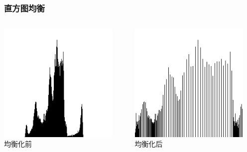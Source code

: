 \documentclass[12pt,hyperref={CJKbookmarks=true}]{beamer}
\begin{document}
\begin{frame}
  \frametitle{直方图均衡}
  \begin{columns}[onlytextwidth]
    \begin{column}{0.5\textwidth}
      \centering
      \includegraphics[width=0.9\textwidth]{histsrc.png}\\
      \footnotesize 均衡化前
    \end{column}
    \begin{column}{0.5\textwidth}
      \centering
      \includegraphics[width=0.9\textwidth]{histequal.png}\\
      \footnotesize 均衡化后
    \end{column}
  \end{columns}
\end{frame}
\end{document}
